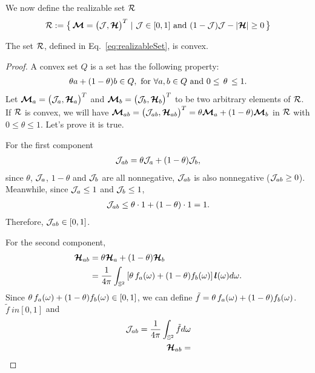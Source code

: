 We now define the realizable set $\mathcal{R}$
\begin{equation}
  \mathcal{R}:=\big\{\,\boldsymbol{\mathcal{M}}=\big(\mathcal{J},\boldsymbol{\mathcal{H}}\big)^{T}~|~\mathcal{J}\in[0,1]~\text{and}~(1-\mathcal{J})\mathcal{J}-|\boldsymbol{\mathcal{H}}|\ge0\,\big\}
  \label{eq:realizableSet}
\end{equation}

\begin{lemma}
  The set $\mathcal{R}$, defined in Eq.~\eqref{eq:realizableSet}, is convex.  
\end{lemma}
\begin{proof}
  A convex set $Q$ is a set has the following property: 
  \begin{align}
  \theta a + (1-\theta)b \in Q, \text{\space} \text{for } \forall a, b \in Q \text{ and } 0\leq\,\theta\,\leq1. 
  \end{align} 
  Let $\boldsymbol{\mathcal{M}}_{a}=\big(\mathcal{J}_{a},\boldsymbol{\mathcal{H}}_{a}\big)^{T}$ and $\boldsymbol{\mathcal{M}}_{b}=\big(\mathcal{J}_{b},\boldsymbol{\mathcal{H}}_{b}\big)^{T}$ to be two arbitrary elements of $\mathcal{R}$.
  If $\mathcal{R}$ is convex, we will have $\boldsymbol{\mathcal{M}}_{ab} = \big(\mathcal{J}_{ab},\boldsymbol{\mathcal{H}}_{ab}\big)^{T} = \theta \boldsymbol{\mathcal{M}}_{a} + (1-\theta)\boldsymbol{\mathcal{M}}_{b}$ in $\mathcal{R}$ with $0\leq\theta\leq1$.
  Let's prove it is true.
  
  For the first component
  \begin{align}
  \mathcal{J}_{ab} = \theta \mathcal{J}_{a} + (1-\theta)\mathcal{J}_{b},
  \end{align}
  since $\theta$, $\mathcal{J}_{a}$, $1-\theta$ and $\mathcal{J}_{b}$ are all nonnegative, $\mathcal{J}_{ab}$ is also nonnegative ($\mathcal{J}_{ab}\geq0$).
  Meanwhile, since $\mathcal{J}_{a}\leq1$ and $\mathcal{J}_{b}\leq1$, 
  \begin{align}
  \mathcal{J}_{ab} \leq \theta \cdot 1 + (1-\theta) \cdot 1 = 1.
  \end{align}
  Therefore, $\mathcal{J}_{ab} \in [0,1]$.
  
  For the second component,
  \begin{align}
  \boldsymbol{\mathcal{H}}_{ab} 
  & = \theta \boldsymbol{\mathcal{H}}_{a} + (1-\theta)\boldsymbol{\mathcal{H}}_{b} \nonumber\\
  & = \frac{1}{4\pi}\int_{\mathbb{S}^{2}} \left[ \theta\,f_{a}(\omega) + (1-\theta) f_{b}(\omega) \right] \boldsymbol{l}(\omega) d\omega. 
  \end{align}
  Since $\theta\,f_{a}(\omega) + (1-\theta) f_{b}(\omega) \in [0,1]$, we can define $\tilde{f} = \theta\,f_{a}(\omega) + (1-\theta) f_{b}(\omega)$.
  $\tilde{f} \ in [0,1]$ and 
  \begin{align}
  \mathcal{J}_{ab} = \frac{1}{4\pi}\int_{\mathbb{S}^{2}} \tilde{f} d\omega \\
  \boldsymbol{\mathcal{H}}_{ab} = 
  \end{align}
\end{proof}

